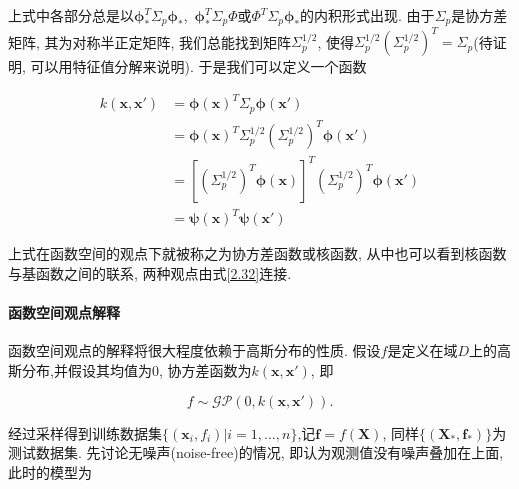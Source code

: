                 上式中各部分总是以$\boldsymbol{\phi}^{T}_{*}\Sigma_{p}\boldsymbol{\phi}_{*}$,\ $\boldsymbol{\phi}^{T}_{*}\Sigma_{p}\boldsymbol{\varPhi}$或$\boldsymbol{\varPhi}^{T}\Sigma_{p}\boldsymbol{\phi}_{*}$的内积形式出现. 由于$\Sigma_{p}$是协方差矩阵, 其为对称半正定矩阵, 我们总能找到矩阵$\Sigma^{1/2}_{p}$, 使得$\Sigma^{1/2}_{p}(\Sigma^{1/2}_{p})^{T}=\Sigma_{p}$(待证明, 可以用特征值分解来说明). 于是我们可以定义一个函数
                
                \begin{equation}\label{2.32}
                    \begin{aligned}
                        k(\boldsymbol{x},\boldsymbol{x}')&=\boldsymbol{\phi}(\boldsymbol{x})^{T}\Sigma_{p}\boldsymbol{\phi}(\boldsymbol{x}') \\
                        &=\boldsymbol{\phi}(\boldsymbol{x})^{T}\Sigma^{1/2}_{p}(\Sigma^{1/2}_{p})^{T}\boldsymbol{\phi}(\boldsymbol{x}') \\
                        &=[(\Sigma^{1/2}_{p})^{T}\boldsymbol{\phi}(\boldsymbol{x})]^{T}(\Sigma^{1/2}_{p})^{T}\boldsymbol{\phi}(\boldsymbol{x}') \\
                        &=\boldsymbol{\psi}(\boldsymbol{x})^{T}\boldsymbol{\psi}(\boldsymbol{x}')
                    \end{aligned}
                \end{equation}

                上式在函数空间的观点下就被称之为协方差函数或核函数, 从中也可以看到核函数与基函数之间的联系, 两种观点由式\ref{2.32}连接.

            \paragraph{函数空间观点解释}

                函数空间观点的解释将很大程度依赖于高斯分布的性质. 假设$f$是定义在域$D$上的高斯分布,并假设其均值为$0$, 协方差函数为$k(\boldsymbol{x},\boldsymbol{x}')$, 即

                \begin{equation}
                    f\sim\mathcal{GP}\left(0, k(\boldsymbol{x}, \boldsymbol{x}')\right).
                \end{equation}
                
                
                经过采样得到训练数据集$\{(\boldsymbol{x}_{i},f_{i})|i=1,\dots,n\}$,记$\boldsymbol{f}=f(\boldsymbol{X})$, 同样$\{(\boldsymbol{X}_{*}, \boldsymbol{f}_{*})\}$为测试数据集. 先讨论无噪声(noise-free)的情况, 即认为观测值没有噪声叠加在上面, 此时的模型为

